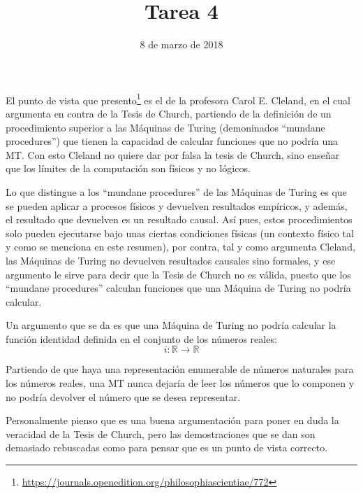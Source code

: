 \documentclass[11pt, a4paper, titlepage]{article}
\begin{document}
\title{Tarea 4}
\date{8 de marzo de 2018}
\maketitle

El punto de vista que presento\footnote{\url{https://journals.openedition.org/philosophiascientiae/772}}
es el de la profesora Carol E. Cleland, en el cual argumenta en contra de la
Tesis de Church, partiendo de la definición de un procedimiento superior a las
Máquinas de Turing (demoninados ``mundane procedures'') que tienen la capacidad
de calcular funciones que no podría una MT. Con esto Cleland no quiere dar por
falsa la tesis de Church, sino enseñar que los límites de la computación son
físicos y no lógicos.

Lo que distingue a los ``mundane procedures'' de las Máquinas de Turing es que se
pueden aplicar a procesos físicos y devuelven resultados empíricos, y además, el
resultado que devuelven es un resultado causal. Así pues, estos procedimientos
solo pueden ejecutarse bajo unas ciertas condiciones físicas (un contexto físico
tal y como se menciona en este resumen), por contra, tal y como argumenta Cleland,
las Máquinas de Turing no devuelven resultados causales sino formales, y ese
argumento le sirve para decir que la Tesis de Church no es válida, puesto
que los ``mundane procedures'' calculan funciones que una Máquina de Turing no podría
calcular.

Un argumento que se da es que una Máquina de Turing no podría calcular la función
identidad definida en el conjunto de los números reales:\\
\begin{equation}
  i \colon \mathbb{R} \to \mathbb{R}
\end{equation}

Partiendo de que haya una representación enumerable de números naturales para los
números reales, una MT nunca dejaría de leer los números que lo componen y no podría
devolver el número que se desea representar.


Personalmente pienso que es una buena argumentación para poner en duda la veracidad
de la Tesis de Church, pero las demostraciones que se dan son demasiado rebuscadas
como para pensar que es un punto de vista correcto.
\end{document}
